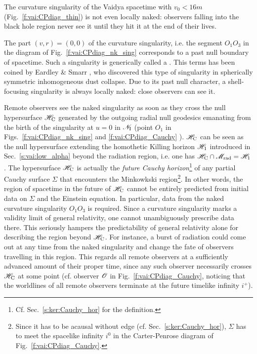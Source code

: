 \begin{remark}
The curvature singularity of the Vaidya spacetime with $v_0 < 16 m$ (Fig.~\ref{f:vai:CPdiag_thin})
is not even locally naked: observers falling into the black hole region never see
it until they hit it at the end of their lives.
\end{remark}

The part  $(v, r) = (0, 0)$ of the curvature singularity, i.e. the segment $O_1 O_3$ in
the diagram of Fig.~\ref{f:vai:CPdiag_nk_sing} corresponds to a past null boundary of
spacetime.
Such a singularity is generically called a
. This terms has been coined by Eardley \& Smarr \cite{EardlS79}, who discovered this type of singularity
in spherically symmetric inhomogeneous dust collapse.
Due to its past null character, a shell-focusing singularity is always locally naked: close observers can see it.



Remote observers see the naked singularity as soon as they cross
the null hypersurface $\mathscr{H}_{\rm C}$ generated by the outgoing radial null geodesics
emanating from the birth of the singularity at $u=0$ in $\mathscr{N}_{\rm I}$
(point $O_1$ in Figs.~\ref{f:vai:CPdiag_nk_sing} and \ref{f:vai:CPdiag_Cauchy} ).
$\mathscr{H}_{\rm C}$ can be seen as the null hypersurface extending the
homothetic Killing horizon $\mathscr{H}_1$ introduced in Sec.~\ref{s:vai:low_alpha}
beyond the radiation region, i.e. one has
$\mathscr{H}_{\rm C} \cap \mathscr{M}_{\rm rad} = \mathscr{H}_1$.
The hypersurface $\mathscr{H}_{\rm C}$ is actually the \emph{future Cauchy horizon}\footnote{Cf. Sec.~\ref{s:ker:Cauchy_hor} for the definition.}
of any partial Cauchy surface $\Sigma$ that encounters the Minkowkski region\footnote{Since it
has to be acausal without edge (cf. Sec.~\ref{s:ker:Cauchy_hor}), $\Sigma$ has to meet the spacelike infinity $i^0$
in the Carter-Penrose diagram of Fig.~\ref{f:vai:CPdiag_Cauchy}.}.
In other words, the region of spacetime in the future of $\mathscr{H}_{\rm C}$ cannot
be entirely predicted from initial data on $\Sigma$ and the Einstein equation.
In particular, data from the naked curvature singularity $O_1 O_3$ is required.
Since a curvature singularity marks a validity limit of general relativity,
one cannot unambiguously prescribe data there. This seriously hampers the
predictability of general relativity alone for describing the region
beyond $\mathscr{H}_{\rm C}$. For instance, a burst of radiation could come
out at any time from the naked singularity and change the fate of observers
travelling in this region. This regards all remote observers at a sufficiently
advanced amount of their proper time, since any such observer necessarily crosses
$\mathscr{H}_{\rm C}$ at some point (cf. observer $\mathscr{O}$ in Fig.~\ref{f:vai:CPdiag_Cauchy},
noticing that the worldlines of all remote observers
terminate at the future timelike infinity $i^+$).



